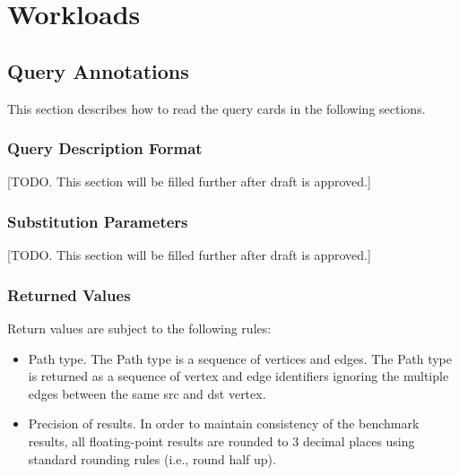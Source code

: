 \chapter{Workloads}
\label{sec:workloads}

\section{Query Annotations}

This section describes how to read the query cards in the following sections.
\subsection{Query Description Format}
\label{subsec:query-description-format}
 [TODO. This section will be filled further after draft is approved.]


\subsection{Substitution Parameters}
\label{subsec:substitution-parameters}
 [TODO. This section will be filled further after draft is approved.]


\subsection{Returned Values}
\label{subsec:returned-values}

Return values are subject to the following rules:
\begin{itemize}
    \item Path type. The Path type is a sequence of vertices and edges. The
          Path type is returned as a sequence of vertex and edge identifiers
          ignoring the multiple edges between the same src and dst vertex.
    \item Precision of results. In order to maintain consistency of the 
          benchmark results, all floating-point results are rounded to 3
          decimal places using standard rounding rules (i.e., round half up).
\end{itemize}

